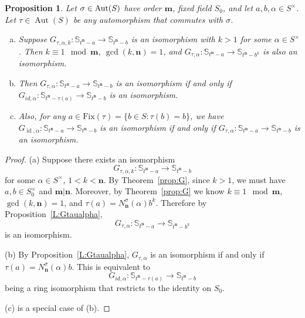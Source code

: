 \documentclass[11pt]{amsart}
\theoremstyle{plain}
\newtheorem{proposition}[theorem]{Proposition}
\theoremstyle{definition}
\numberwithin{equation}{section}
\numberwithin{figure}{section}
\newcommand{\Sone}[1]{\Stsigma/\Stsigma (t^{\de}-#1)} %
\newcommand{\ring}{S}
\newcommand{\Stsigma}{S[t;\sigma]}
\DeclareMathOperator{\id}{id}
\newcommand{\os}{\mathbf{m}}  %
\newcommand{\de}{\mathbf{n}}  %
\DeclareMathOperator{\Aut}{Aut}
\begin{document}
\begin{proposition}\label{t:code}
Let  $\sigma\in {\rm Aut}(\ring)$ have order $\os$, fixed field $\ring_0$, and let $a,b,\alpha\in S^\times$.  Let  $\tau\in \Aut(\ring)$ be any automorphism that commutes with $\sigma$.
\begin{enumerate}[(a)]
\item
 Suppose  $G_{\tau,\alpha,k}:\mathbb{S}_{t^\de-a} \to \mathbb{S}_{t^\de-b} %
 $ is an isomorphism with $k>1$ for some $\alpha\in \ring^\times$.  Then $k\equiv 1 \mod \os$,  $\gcd(k,\de)=1$, and $G_{\tau,\alpha}:\mathbb{S}_{t^\de-a} \to \mathbb{S}_{t^\de-b^k} %
 $ is also an isomorphism.

\item  Then $G_{\tau,\alpha}:\mathbb{S}_{t^\de-a} \to \mathbb{S}_{t^\de-b} %
$ is an isomorphism   if and only if $G_{id,\alpha}:\mathbb{S}_{t^\de-\tau(a)} \to \mathbb{S}_{t^\de-b} %
$ is an isomorphism.


\item
 Also, for any $a\in \mathrm{Fix}(\tau)=\{b\in \ring:\tau(b)=b\}$, we have $G_{\id,\alpha}:\mathbb{S}_{t^\de-a} \to \mathbb{S}_{t^\de-b} 
 $ is an isomorphism if and only if $G_{\tau,\alpha}:\mathbb{S}_{t^\de-a} \to \mathbb{S}_{t^\de-b}$  is an isomorphism.
 \end{enumerate}
\end{proposition}

\begin{proof}
(a)  Suppose there  exists an isomorphism $$
G_{\tau,\alpha,k}:\mathbb{S}_{t^\de-a} \to \mathbb{S}_{t^\de-b} 
$$ for some $\alpha\in S^\times$, $1< k<\de$.
By Theorem~\ref{prop:G}, since $k>1$, we must have
 $a,b\in S_0^\times$ and $\os|\de$.  Moreover,  by Theorem~\ref{prop:G} we know
 $k\equiv 1 \mod \os$,  $\gcd(k,\de)=1$, and $\tau(a)=N_{\de}^\sigma(\alpha)b^k$.
Therefore by Proposition~\ref{L:Gtaualpha},
$$G_{\tau,\alpha}: \mathbb{S}_{t^\de-a} \to \mathbb{S}_{t^\de-b^k} 
$$ is  an isomorphism.

\noindent (b) By Proposition~\ref{L:Gtaualpha}, $G_{\tau,\alpha}$ is an isomorphism if and only if  $\tau(a)= N_{\de}^\sigma(\alpha)b$. This is equivalent to
$$G_{id,\alpha}: \mathbb{S}_{t^\de-\tau(a)} \to \mathbb{S}_{t^\de-b} 
$$
being a ring isomorphism that restricts to the identity on $\ring_0$.


\noindent (c) is a special case of (b).
\end{proof}
\end{document}
